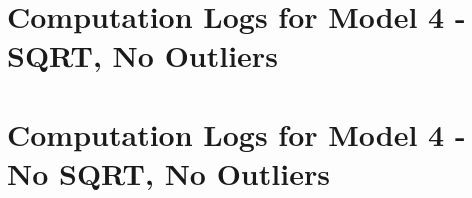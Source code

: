 \begin{landscape}
    \section{Computation Logs for Model 4 - SQRT, No Outliers}
    


    \newpage
    \section{Computation Logs for Model 4 - No SQRT, No Outliers}
    


\end{landscape}

% 

%     

% 

%     

